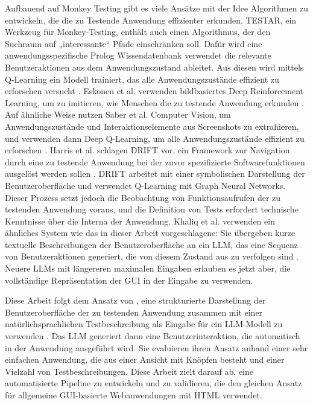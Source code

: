 Aufbauend auf Monkey Testing gibt es viele Ansätze mit der Idee Algorithmen zu entwickeln, die die zu Testende Anwendung effizienter erkunden.
TESTAR, ein Werkzeug für Monkey-Testing, enthält auch einen Algorithmus, der den Suchraum auf „interessante“ Pfade einschränken soll.
Dafür wird eine anwendungsspezifische Prolog Wissendatenbank verwendet die relevante Benutzeraktionen aus dem Anwendungszustand ableitet.
Aus diesen wird mittels Q-Learning ein Modell trainiert, das alle Anwendungszustände effizient zu erforschen versucht \cite{testar-q-learning}.
Eskonen et al. verwenden bildbasiertes Deep Reinforcement Learning, um zu imitieren, wie Menschen die zu testende Anwendung erkunden \cite{deep_reinforcement_exploring}.
Auf ähnliche Weise nutzen Saber et al. Computer Vision, um Anwendungszustände und Interaktionselemente aus Screenshots zu extrahieren, und verwenden dann Deep Q-Learning, um alle Anwendungszustände effizient zu erforschen \cite{saber_testing}. 
Harris et al. schlagen DRIFT vor, ein Framework zur Navigation durch eine zu testende Anwendung bei der zuvor spezifizierte Softwarefunktionen ausgelöst werden sollen \cite{harries2020drift}.
DRIFT arbeitet mit einer symbolischen Darstellung der Benutzeroberfläche und verwendet Q-Learning mit Graph Neural Networks.
Dieser Prozess setzt jedoch die Beobachtung von Funktionsaufrufen der zu testenden Anwendung voraus, und die Definition von Tests erfordert technische Kenntnisse über die Interna der Anwendung.
Khaliq et al. verwenden ein ähnliches System wie das in dieser Arbeit vorgeschlagene: Sie übergeben kurze textuelle Beschreibungen der Benutzeroberfläche an ein LLM, das eine Sequenz von Benutzeraktionen generiert, die von diesem Zustand aus zu verfolgen sind \cite{transformers_exploratory}.
Neuere LLMs mit längereren maximalen Eingaben erlauben es jetzt aber, die vollständige Repräsentation der GUI in der Eingabe zu verwenden.

Diese Arbeit folgt dem Ansatz von , eine strukturierte Darstellung der Benutzeroberfläche der zu testenden Anwendung zusammen mit einer natürlichsprachlichen Testbeschreibung als Eingabe für ein LLM-Modell zu verwenden \cite{GPT3Testing}.
Das LLM generiert dann eine Benutzerinteraktion, die automatisch in der Anwendung ausgeführt wird.
Sie evaluieren ihren Ansatz anhand einer sehr einfachen Anwendung, die aus einer Ansicht mit Knöpfen besteht und einer Vielzahl von Testbeschreibungen.
Diese Arbeit zielt darauf ab, eine automatisierte Pipeline zu entwickeln und zu validieren, die den gleichen Ansatz für allgemeine GUI-basierte Webanwendungen mit HTML verwendet.

